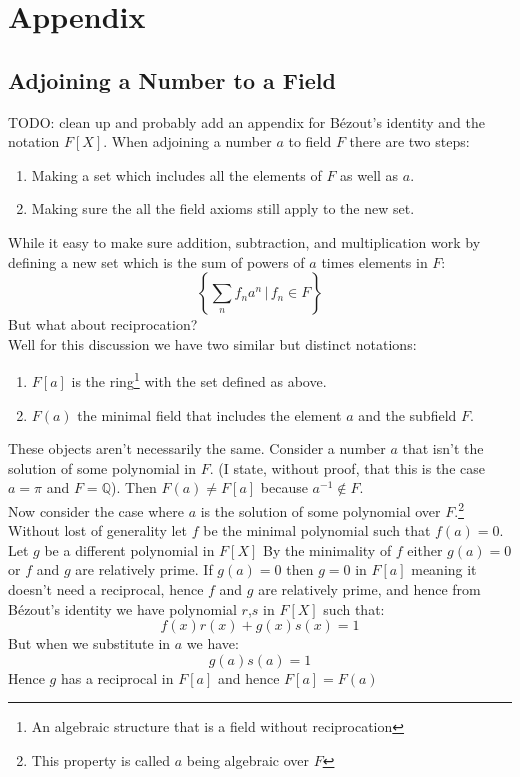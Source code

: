 
\chapter{Appendix}
\section{Adjoining a Number to a Field}
\label{appx:adjoining}
TODO: clean up and probably add an appendix for Bézout's identity and the notation $F[X]$.
When adjoining a number $a$ to field $F$ there are two steps:
\begin{enumerate}
\item Making a set which includes all the elements of $F$ as well as $a$.
\item Making sure the all the field axioms still apply to the new set.
\end{enumerate}
While it easy to make sure addition, subtraction, and multiplication work by defining a new set which is the sum of powers of $a$ times elements in $F$:
\[\left\{\sum_n f_na^n\, |\, f_n \in F\right\}\]
But what about reciprocation? 
\\

Well for this discussion we have two similar but distinct notations:
\begin{enumerate}
	\item $F[a]$ is the ring\footnote{An algebraic structure that is a field without reciprocation} with the set defined as above.
	\item $F(a)$ the minimal field that includes the element $a$ and the subfield $F$.
\end{enumerate}

These objects aren't necessarily the same.
Consider a number $a$ that isn't the solution of some polynomial in $F$.
(I state, without proof, that this is the case $a=\pi$ and $F=\mathbb{Q}$).
Then $F(a) \neq F[a]$ because $a^{-1}  \not \in F$.
\\

Now consider the case where $a$ is the solution of some polynomial over $F$.\footnote{This property is called $a$ being algebraic over $F$}
Without lost of generality let $f$ be the minimal polynomial such that $f(a)=0$.
Let $g$ be a different polynomial in $F[X]$
By the minimality of $f$ either $g(a)=0$ or $f$ and $g$ are relatively prime.
If $g(a)=0$ then $g=0$ in $F[a]$ meaning it doesn't need a reciprocal,
hence $f$ and $g$ are relatively prime,
and hence from Bézout's identity we have polynomial $r$,$s$ in $F[X]$ such that:
\[f(x)r(x)+g(x)s(x) = 1\]
But when we substitute in $a$ we have:
\[g(a)s(a) = 1\]
Hence $g$ has a reciprocal in $F[a]$ and hence $F[a] = F(a)$
\\

